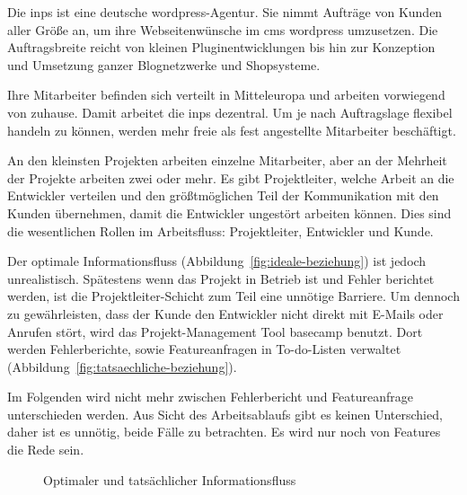 Die \gls{inps} ist eine deutsche \gls{wordpress}-Agentur. Sie nimmt Aufträge von Kunden aller Größe an, um ihre Webseitenwünsche im \gls{cms} \gls{wordpress} umzusetzen. Die Auftragsbreite reicht von kleinen Pluginentwicklungen bis hin zur Konzeption und Umsetzung ganzer Blognetzwerke und Shopsysteme.

Ihre Mitarbeiter befinden sich verteilt in Mitteleuropa und arbeiten vorwiegend von zuhause. Damit arbeitet die \gls{inps} dezentral. Um je nach Auftragslage flexibel handeln zu können, werden mehr freie als fest angestellte Mitarbeiter beschäftigt.

An den kleinsten Projekten arbeiten einzelne Mitarbeiter, aber an der Mehrheit der Projekte arbeiten zwei oder mehr. Es gibt Projektleiter, welche Arbeit an die Entwickler verteilen und den größtmöglichen Teil der Kommunikation mit den Kunden übernehmen, damit die Entwickler ungestört arbeiten können. Dies sind die wesentlichen Rollen im Arbeitsfluss: Projektleiter, Entwickler und Kunde.

Der optimale Informationsfluss (Abbildung~\ref{fig:ideale-beziehung}) ist jedoch unrealistisch. Spätestens wenn das Projekt in Betrieb ist und Fehler berichtet werden, ist die Projektleiter-Schicht zum Teil eine unnötige Barriere. Um dennoch zu gewährleisten, dass der Kunde den Entwickler nicht direkt mit E-Mails oder Anrufen stört, wird das Projekt-Management Tool \Gls{basecamp} benutzt. Dort werden Fehlerberichte, sowie Featureanfragen in To-do-Listen verwaltet (Abbildung~\ref{fig:tatsaechliche-beziehung}).

Im Folgenden wird nicht mehr zwischen Fehlerbericht und Featureanfrage unterschieden werden. Aus Sicht des Arbeitsablaufs gibt es keinen Unterschied, daher ist es unnötig, beide Fälle zu betrachten. Es wird nur noch von Features die Rede sein.

\begin{figure}
	\centering
	
	\caption{Optimaler und tatsächlicher Informationsfluss}
	\label{fig:personen_beziehungen}
\end{figure}

